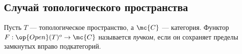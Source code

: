 \documentclass[
	extrafontsizes,
	11pt,
	hyphens,
]{memoir}
\begin{document}

\subsection{Случай топологического пространства}


\begin{definition}
Пусть \(T\) --- топологическое пространство, а \(\mc{C}\) --- категория.
Функтор \(F : \op{Open}(T)^o \to \mc{C}\) называется \emph{пучком}, если он сохраняет пределы замкнутых вправо подкатегорий.
\end{definition}



\end{document}
